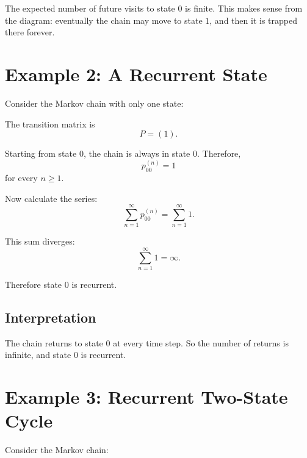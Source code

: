 \documentclass[12pt,a4paper]{article}
\theoremstyle{notestyle}
\begin{document}
The expected number of future visits to state $0$ is finite. This makes sense from the diagram: eventually the chain may move to state $1$, and then it is trapped there forever.

\section{Example 2: A Recurrent State}

Consider the Markov chain with only one state:

\begin{center}
\end{center}

The transition matrix is
\[
P=(1).
\]

Starting from state $0$, the chain is always in state $0$. Therefore,
\[
p_{00}^{(n)}=1
\]
for every $n\geq 1$.

Now calculate the series:
\[
\sum_{n=1}^{\infty}p_{00}^{(n)}
=
\sum_{n=1}^{\infty}1.
\]

This sum diverges:
\[
\sum_{n=1}^{\infty}1=\infty.
\]

Therefore state $0$ is recurrent.

\subsection{Interpretation}

The chain returns to state $0$ at every time step. So the number of returns is infinite, and state $0$ is recurrent.

\section{Example 3: Recurrent Two-State Cycle}

Consider the Markov chain:

\begin{center}
\end{center}
\end{document}
